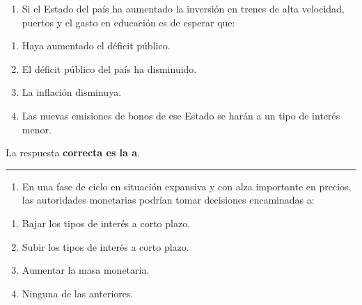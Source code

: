 \documentclass[
  letterpaper,
  DIV=11,
  numbers=noendperiod]{scrreprt}
\providecommand{\tightlist}{%
  \setlength{\itemsep}{0pt}\setlength{\parskip}{0pt}}\usepackage{longtable,booktabs,array}
\begin{document}
\begin{enumerate}
\def\labelenumi{\arabic{enumi}.}
\setcounter{enumi}{50}
\tightlist
\item
  Si el Estado del país ha aumentado la inversión en trenes de alta
  velocidad, puertos y el gasto en educación es de esperar que:
\end{enumerate}

\begin{enumerate}
\def\labelenumi{\alph{enumi}.}
\item
  Haya aumentado el déficit público.
\item
  El déficit público del país ha disminuido.
\item
  La inflación disminuya.
\item
  Las nuevas emisiones de bonos de ese Estado se harán a un tipo de
  interés menor.
\end{enumerate}

\begin{tcolorbox}[enhanced jigsaw, left=2mm, opacityback=0, colback=white, breakable, arc=.35mm, bottomrule=.15mm, rightrule=.15mm, toprule=.15mm, leftrule=.75mm, colframe=quarto-callout-tip-color-frame]
\begin{minipage}[t]{5.5mm}
\textcolor{quarto-callout-tip-color}{\faLightbulb}
\end{minipage}%
\begin{minipage}[t]{\textwidth - 5.5mm}

La respuesta \textbf{correcta es la a}.

\end{minipage}%
\end{tcolorbox}

\begin{center}\rule{0.5\linewidth}{0.5pt}\end{center}

\begin{enumerate}
\def\labelenumi{\arabic{enumi}.}
\setcounter{enumi}{51}
\tightlist
\item
  En una fase de ciclo en situación expansiva y con alza importante en
  precios, las autoridades monetarias podrían tomar decisiones
  encaminadas a:
\end{enumerate}

\begin{enumerate}
\def\labelenumi{\alph{enumi}.}
\item
  Bajar los tipos de interés a corto plazo.
\item
  Subir los tipos de interés a corto plazo.
\item
  Aumentar la masa monetaria.
\item
  Ninguna de las anteriores.
\end{enumerate}
\end{document}
